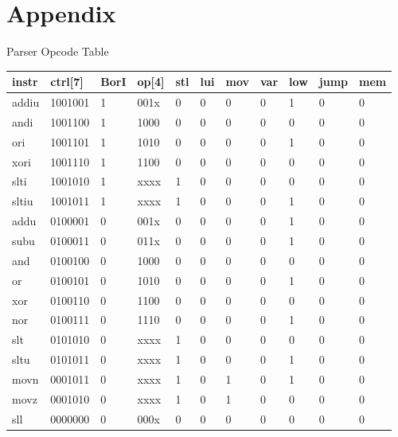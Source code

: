 \documentclass[10pt]{article}
\begin{document}
\section{Appendix}
\begin{center}
  Parser Opcode Table\\
\begin{tabular}{|lllllllllll|}
\hline
\textbf{instr} & \textbf{ctrl{[}7{]}} & \textbf{BorI} & \textbf{op{[}4{]}} & \textbf{stl} & \textbf{lui} & \textbf{mov} & \textbf{var} & \textbf{low} & \textbf{jump} & \textbf{mem} \\ \hline
addiu & \multicolumn{1}{l|}{1001001} & 1 & 001x & 0 & 0 & 0 & 0 & 1 & 0 & 0 \\
andi & \multicolumn{1}{l|}{1001100} & 1 & 1000 & 0 & 0 & 0 & 0 & 0 & 0 & 0 \\
ori & \multicolumn{1}{l|}{1001101} & 1 & 1010 & 0 & 0 & 0 & 0 & 1 & 0 & 0 \\
xori & \multicolumn{1}{l|}{1001110} & 1 & 1100 & 0 & 0 & 0 & 0 & 0 & 0 & 0 \\
slti & \multicolumn{1}{l|}{1001010} & 1 & xxxx & 1 & 0 & 0 & 0 & 0 & 0 & 0 \\
sltiu & \multicolumn{1}{l|}{1001011} & 1 & xxxx & 1 & 0 & 0 & 0 & 1 & 0 & 0 \\
addu & \multicolumn{1}{l|}{0100001} & 0 & 001x & 0 & 0 & 0 & 0 & 1 & 0 & 0 \\
subu & \multicolumn{1}{l|}{0100011} & 0 & 011x & 0 & 0 & 0 & 0 & 1 & 0 & 0 \\
and & \multicolumn{1}{l|}{0100100} & 0 & 1000 & 0 & 0 & 0 & 0 & 0 & 0 & 0 \\
or & \multicolumn{1}{l|}{0100101} & 0 & 1010 & 0 & 0 & 0 & 0 & 1 & 0 & 0 \\
xor & \multicolumn{1}{l|}{0100110} & 0 & 1100 & 0 & 0 & 0 & 0 & 0 & 0 & 0 \\
nor & \multicolumn{1}{l|}{0100111} & 0 & 1110 & 0 & 0 & 0 & 0 & 1 & 0 & 0 \\
slt & \multicolumn{1}{l|}{0101010} & 0 & xxxx & 1 & 0 & 0 & 0 & 0 & 0 & 0 \\
sltu & \multicolumn{1}{l|}{0101011} & 0 & xxxx & 1 & 0 & 0 & 0 & 1 & 0 & 0 \\
movn & \multicolumn{1}{l|}{0001011} & 0 & xxxx & 1 & 0 & 1 & 0 & 1 & 0 & 0 \\
movz & \multicolumn{1}{l|}{0001010} & 0 & xxxx & 1 & 0 & 1 & 0 & 0 & 0 & 0 \\
sll & \multicolumn{1}{l|}{0000000} & 0 & 000x & 0 & 0 & 0 & 0 & 0 & 0 & 0 \\

\end{tabular}
\end{center}
\end{document}

